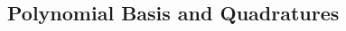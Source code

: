 \begin{frame}
\begin{multicols}{2}

        \vspace*{\fill}

    \end{multicols}
    \vspace*{\fill}
    
\end{frame}

\subsection{Polynomial Basis and Quadratures}

